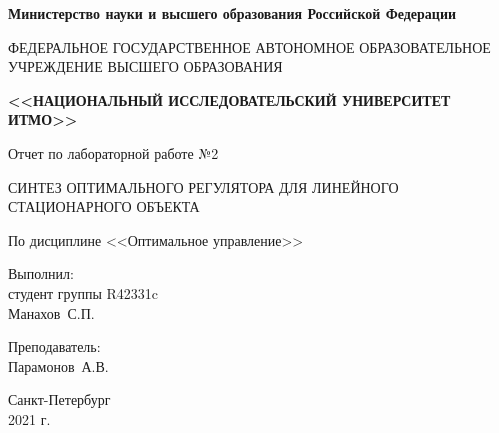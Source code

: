 \begin{titlepage}
	\begin{center}
		\begin{small}
			\textbf{Министерство науки и высшего образования Российской Федерации}

			ФЕДЕРАЛЬНОЕ ГОСУДАРСТВЕННОЕ АВТОНОМНОЕ ОБРАЗОВАТЕЛЬНОЕ УЧРЕЖДЕНИЕ ВЫСШЕГО ОБРАЗОВАНИЯ
			
			\textbf{<<НАЦИОНАЛЬНЫЙ ИССЛЕДОВАТЕЛЬСКИЙ УНИВЕРСИТЕТ ИТМО>>}
		\end{small}
		
		\vspace{10em}
		
		Отчет по лабораторной работе №2
		
		\vspace{1ex}
		
		СИНТЕЗ ОПТИМАЛЬНОГО РЕГУЛЯТОРА ДЛЯ ЛИНЕЙНОГО СТАЦИОНАРНОГО ОБЪЕКТА
		
		\vspace{1ex}
		
		По дисциплине <<Оптимальное управление>>
	\end{center}
	
	\vspace{10em}
	
	\begin{flushright}
		Выполнил:\\
		студент группы R42331c\\
		Манахов~С.П.
		
		\vspace{1em}
		
		Преподаватель:\\
		Парамонов~А.В.
	\end{flushright}

	\vfill
	
	\begin{center}
		\small
		Санкт-Петербург\\
		2021 г.\\
	\end{center}
\end{titlepage}